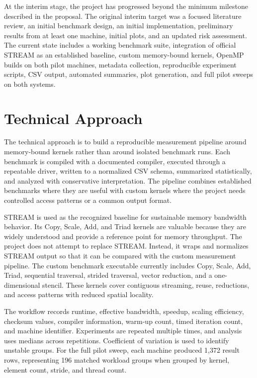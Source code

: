 \documentclass[11pt]{article}
\begin{document}
At the interim stage, the project has progressed beyond the minimum milestone described in the proposal. The original interim target was a focused literature review, an initial benchmark design, an initial implementation, preliminary results from at least one machine, initial plots, and an updated risk assessment. The current state includes a working benchmark suite, integration of official STREAM as an established baseline, custom memory-bound kernels, OpenMP builds on both pilot machines, metadata collection, reproducible experiment scripts, CSV output, automated summaries, plot generation, and full pilot sweeps on both systems.

\section{Technical Approach}

The technical approach is to build a reproducible measurement pipeline around memory-bound kernels rather than around isolated benchmark runs. Each benchmark is compiled with a documented compiler, executed through a repeatable driver, written to a normalized CSV schema, summarized statistically, and analyzed with conservative interpretation. The pipeline combines established benchmarks where they are useful with custom kernels where the project needs controlled access patterns or a common output format.

STREAM is used as the recognized baseline for sustainable memory bandwidth behavior. Its Copy, Scale, Add, and Triad kernels are valuable because they are widely understood and provide a reference point for memory throughput. The project does not attempt to replace STREAM. Instead, it wraps and normalizes STREAM output so that it can be compared with the custom measurement pipeline. The custom benchmark executable currently includes Copy, Scale, Add, Triad, sequential traversal, strided traversal, vector reduction, and a one-dimensional stencil. These kernels cover contiguous streaming, reuse, reductions, and access patterns with reduced spatial locality.

The workflow records runtime, effective bandwidth, speedup, scaling efficiency, checksum values, compiler information, warm-up count, timed iteration count, and machine identifier. Experiments are repeated multiple times, and analysis uses medians across repetitions. Coefficient of variation is used to identify unstable groups. For the full pilot sweep, each machine produced 1,372 result rows, representing 196 matched workload groups when grouped by kernel, element count, stride, and thread count.
\end{document}
